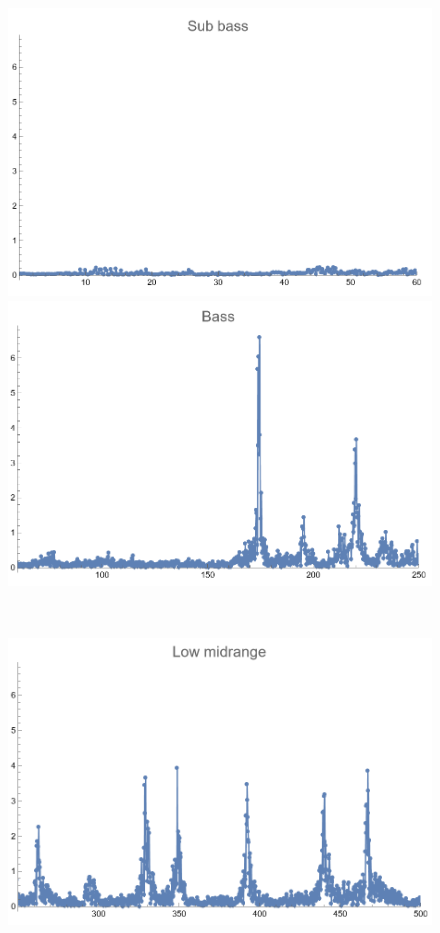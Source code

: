 \documentclass[12pt, letterpaper]{article}
\begin{document}
\begin{figure}[H]
  \centering
  \begin{minipage}{.3\textwidth}
    \centering
    \includegraphics[width=.9\linewidth]{imgs/Cancion3/subbass.png}
  \end{minipage}
  \begin{minipage}{0.03\textwidth}\end{minipage}
  \begin{minipage}{.3\textwidth}
    \centering
    \includegraphics[width=.9\linewidth]{imgs/Cancion3/bass.png}
  \end{minipage} \medskip \\
  \begin{minipage}{.3\textwidth}
    \centering
    \includegraphics[width=.9\linewidth]{imgs/Cancion3/lowmid.png}

\end{minipage}
\end{figure}
\end{document}
